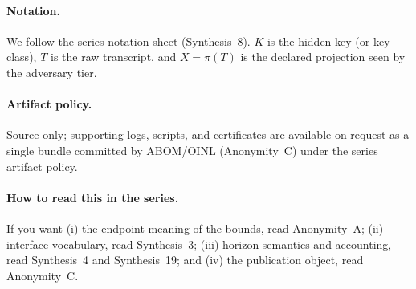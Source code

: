 \documentclass[11pt]{article}
\begin{document}
\paragraph{Notation.}
We follow the series notation sheet (Synthesis~8).\cite{series:notation}
$K$ is the hidden key (or key-class), $T$ is the raw transcript, and $X=\pi(T)$ is the declared projection seen by the adversary tier.

\paragraph{Artifact policy.}
Source-only; supporting logs, scripts, and certificates are available on request as a single bundle committed by ABOM/OINL (Anonymity~C) under the series artifact policy.\cite{series:abomoinl,series:artifactpolicy}

\paragraph{How to read this in the series.}
If you want (i) the endpoint meaning of the bounds, read Anonymity~A; (ii) interface vocabulary, read Synthesis~3; (iii) horizon semantics and accounting, read Synthesis~4 and Synthesis~19; and (iv) the publication object, read Anonymity~C.\cite{series:oddsinflation,series:traceifaces,series:threatwindows,series:accountingrulebook,series:condcert,series:abomoinl}
\end{document}
